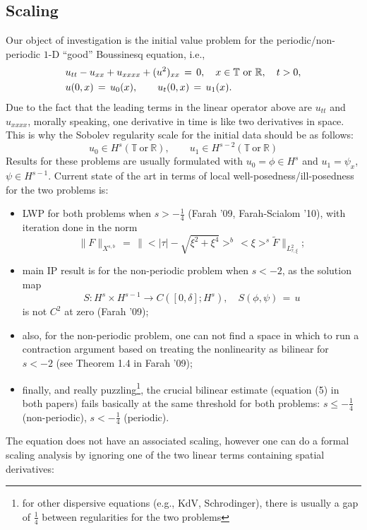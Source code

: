\documentclass[12pt,reqno]{amsart}
\numberwithin{equation}{section}  %
\begin{document}
\begin{appendices}
\section{Scaling} 
\label{sec:scaling}
Our object of investigation is the initial value problem for the
periodic/non-periodic $1$-D ``good'' Boussinesq equation, i.e.,
\begin{equation}
  \aligned
  & u_{tt}-u_{xx}+u_{xxxx}+ (u^2)_{xx}\,=\,0, \quad x\in \mathbb{T}\ \text{or} \ \mathbb{R}, \quad t>0,\\
&u(0,x)\,=\,u_0(x),\qquad u_t(0,x)\,=\,u_1(x).\endaligned
\label{main}
\end{equation}
Due to the fact that the leading terms in the linear operator above are $u_{tt}$ and $u_{xxxx}$, morally speaking, one derivative in time is like two derivatives in space. This is why the Sobolev regularity scale for the initial data should be as follows:
\[
u_0\in H^s(\mathbb{T}\ \text{or} \ \mathbb{R}), \qquad u_1\in H^{s-2}(\mathbb{T}\ \text{or} \ \mathbb{R})
\]
Results for these problems are usually formulated with $u_0=\phi \in H^s$ and $u_1=\psi_x$, $\psi\in H^{s-1}$.
Current state of the art in terms of local well-posedness/ill-posedness for the two problems is:
\begin{itemize}
  \item LWP for both problems when $s>-\frac 14$ (Farah '09, Farah-Scialom '10), with iteration done in
    the norm
    \[
    \|F\|_{X^{s,b}}\,=\,\|<|\tau|-\sqrt{\xi^2+\xi^4}>^b\,<\xi>^s \tilde{F}\|_{L^2_{\tau,\xi}};
    \]
  \item main IP result is for the non-periodic problem when $s<-2$, as the solution map 
    \[
    S: H^s\times H^{s-1} \to C([0,\delta]; H^s), \quad
    S(\phi,\psi)\,=\,u
    \]
    is not $C^2$ at zero (Farah '09);
  \item also, for the non-periodic problem, one can not find a space in which to run a contraction argument based on treating the nonlinearity as bilinear for $s<-2$ (see Theorem 1.4 in Farah '09);
  \item finally, and really puzzling\footnote{for other dispersive equations (e.g., KdV, Schrodinger), there is usually a gap of $\frac 14$ between regularities for the two problems}, the crucial bilinear estimate (equation (5) in both papers) fails basically at the same threshold for both problems: $s\leq -\frac 14$ (non-periodic), $s<-\frac{1}{4}$ (periodic).
\end{itemize}
The equation does not have an associated scaling, however one can do a formal scaling analysis by ignoring one of the two linear terms containing spatial derivatives:

\end{appendices}
\end{document}
